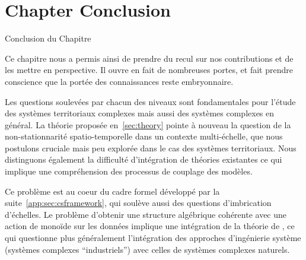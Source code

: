



\newpage


\section*{Chapter Conclusion}{Conclusion du Chapitre}




Ce chapitre nous a permis ainsi de prendre du recul sur nos contributions et de les mettre en perspective. Il ouvre en fait de nombreuses portes, et fait prendre conscience que la portée des connaissances reste embryonnaire.


Les questions soulevées par chacun des niveaux sont fondamentales pour l'étude des systèmes territoriaux complexes mais aussi des systèmes complexes en général. La théorie proposée en~\ref{sec:theory} pointe à nouveau la question de la non-stationnarité spatio-temporelle dans un contexte multi-échelle, que nous postulons cruciale mais peu explorée dans le cas des systèmes territoriaux. Nous distinguons également la difficulté d'intégration de théories existantes ce qui implique une compréhension des processus de couplage des modèles.

Ce problème est au coeur du cadre formel développé par la suite~\ref{app:sec:csframework}, qui soulève aussi des questions d'imbrication d'échelles. Le problème d'obtenir une structure algébrique cohérente avec une action de monoïde sur les données implique une intégration de la théorie de , ce qui questionne plus généralement l'intégration des approches d'ingénierie système (systèmes complexes ``industriels'') avec celles de systèmes complexes naturels.


